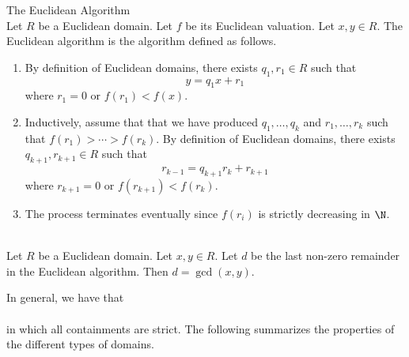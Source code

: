 \documentclass[a4paper]{article}
\begin{document}
\begin{defn}{The Euclidean Algorithm}{}\\
Let $R$ be a Euclidean domain. Let $f$ be its Euclidean valuation. Let $x,y\in R$. The Euclidean algorithm is the algorithm defined as follows. 
\begin{enumerate}
\item By definition of Euclidean domains, there exists $q_1,r_1\in R$ such that $$y=q_1x+r_1$$ where $r_1=0$ or $f(r_1)<f(x)$. 
\item Inductively, assume that that we have produced $q_1,\dots,q_k$ and $r_1,\dots,r_k$ such that $f(r_1)>\cdots>f(r_k)$. By definition of Euclidean domains, there exists $q_{k+1},r_{k+1}\in R$ such that $$r_{k-1}=q_{k+1}r_k+r_{k+1}$$ where $r_{k+1}=0$ or $f(r_{k+1})<f(r_k)$. 
\item The process terminates eventually since $f(r_i)$ is strictly decreasing in $\N$. 
\end{enumerate}
\end{defn}

\begin{prp}{}{}\\
Let $R$ be a Euclidean domain. Let $x,y\in R$. Let $d$ be the last non-zero remainder in the Euclidean algorithm. Then $d=\gcd(x,y)$. 
\end{prp}

In general, we have that \\
\\
in which all containments are strict. The following summarizes the properties of the different types of domains. \\
\end{document}
